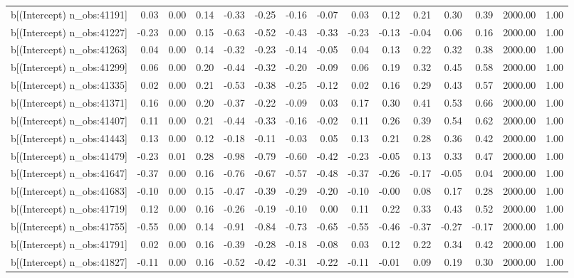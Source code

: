 \begin{table}[ht]
\begin{tabular}{rrrrrrrrrrrrrrr}
  b[(Intercept) n\_obs:41191] & 0.03 & 0.00 & 0.14 & -0.33 & -0.25 & -0.16 & -0.07 & 0.03 & 0.12 & 0.21 & 0.30 & 0.39 & 2000.00 & 1.00 \\ 
  b[(Intercept) n\_obs:41227] & -0.23 & 0.00 & 0.15 & -0.63 & -0.52 & -0.43 & -0.33 & -0.23 & -0.13 & -0.04 & 0.06 & 0.16 & 2000.00 & 1.00 \\ 
  b[(Intercept) n\_obs:41263] & 0.04 & 0.00 & 0.14 & -0.32 & -0.23 & -0.14 & -0.05 & 0.04 & 0.13 & 0.22 & 0.32 & 0.38 & 2000.00 & 1.00 \\ 
  b[(Intercept) n\_obs:41299] & 0.06 & 0.00 & 0.20 & -0.44 & -0.32 & -0.20 & -0.09 & 0.06 & 0.19 & 0.32 & 0.45 & 0.58 & 2000.00 & 1.00 \\ 
  b[(Intercept) n\_obs:41335] & 0.02 & 0.00 & 0.21 & -0.53 & -0.38 & -0.25 & -0.12 & 0.02 & 0.16 & 0.29 & 0.43 & 0.57 & 2000.00 & 1.00 \\ 
  b[(Intercept) n\_obs:41371] & 0.16 & 0.00 & 0.20 & -0.37 & -0.22 & -0.09 & 0.03 & 0.17 & 0.30 & 0.41 & 0.53 & 0.66 & 2000.00 & 1.00 \\ 
  b[(Intercept) n\_obs:41407] & 0.11 & 0.00 & 0.21 & -0.44 & -0.33 & -0.16 & -0.02 & 0.11 & 0.26 & 0.39 & 0.54 & 0.62 & 2000.00 & 1.00 \\ 
  b[(Intercept) n\_obs:41443] & 0.13 & 0.00 & 0.12 & -0.18 & -0.11 & -0.03 & 0.05 & 0.13 & 0.21 & 0.28 & 0.36 & 0.42 & 2000.00 & 1.00 \\ 
  b[(Intercept) n\_obs:41479] & -0.23 & 0.01 & 0.28 & -0.98 & -0.79 & -0.60 & -0.42 & -0.23 & -0.05 & 0.13 & 0.33 & 0.47 & 2000.00 & 1.00 \\ 
  b[(Intercept) n\_obs:41647] & -0.37 & 0.00 & 0.16 & -0.76 & -0.67 & -0.57 & -0.48 & -0.37 & -0.26 & -0.17 & -0.05 & 0.04 & 2000.00 & 1.00 \\ 
  b[(Intercept) n\_obs:41683] & -0.10 & 0.00 & 0.15 & -0.47 & -0.39 & -0.29 & -0.20 & -0.10 & -0.00 & 0.08 & 0.17 & 0.28 & 2000.00 & 1.00 \\ 
  b[(Intercept) n\_obs:41719] & 0.12 & 0.00 & 0.16 & -0.26 & -0.19 & -0.10 & 0.00 & 0.11 & 0.22 & 0.33 & 0.43 & 0.52 & 2000.00 & 1.00 \\ 
  b[(Intercept) n\_obs:41755] & -0.55 & 0.00 & 0.14 & -0.91 & -0.84 & -0.73 & -0.65 & -0.55 & -0.46 & -0.37 & -0.27 & -0.17 & 2000.00 & 1.00 \\ 
  b[(Intercept) n\_obs:41791] & 0.02 & 0.00 & 0.16 & -0.39 & -0.28 & -0.18 & -0.08 & 0.03 & 0.12 & 0.22 & 0.34 & 0.42 & 2000.00 & 1.00 \\ 
  b[(Intercept) n\_obs:41827] & -0.11 & 0.00 & 0.16 & -0.52 & -0.42 & -0.31 & -0.22 & -0.11 & -0.01 & 0.09 & 0.19 & 0.30 & 2000.00 & 1.00 \\ 

\end{tabular}
\end{table}

